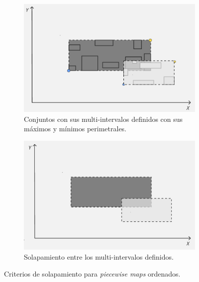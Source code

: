         \begin{figure}[h]
    \centering
    \begin{subfigure}[b]{0.48\linewidth}
        \centering
        \includegraphics[width=\linewidth]{figures/optimizaciones pwmap/op simils/mi1.png}
        \caption{Conjuntos con sus multi-intervalos definidos con sus máximos y mínimos perimetrales.}
        \label{fig:crit-suma-dominio}
    \end{subfigure}
    \hfill
    \begin{subfigure}[b]{0.48\linewidth}
        \centering
        \includegraphics[width=\linewidth]{figures/optimizaciones pwmap/op simils/mi2.png}
        \caption{Solapamiento entre los multi-intervalos definidos.}
        \label{fig:crit-suma-extremos}
    \end{subfigure}
    \caption{Criterios de solapamiento para \textit{piecewise maps} ordenados.}
    \label{fig:crit-suma}
\end{figure}

